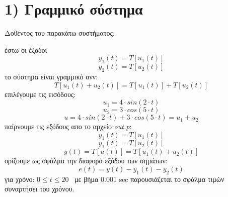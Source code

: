 \documentclass{article}
\begin{document}
\section*{1) Γραμμικό σύστημα}
\large
Δοθέντος του παρακάτω συστήματος:
\begin{center}

\end{center}
έστω οι έξοδοι 
\begin{equation*}
y_1(t) = T\left[u_1(t)\right]
\end{equation*}
\begin{equation*}
y_2(t) = T\left[u_2(t)\right]
\end{equation*}
το σύστημα είναι γραμμικό ανν: 
\begin{equation*}
T\left[u_1(t) + u_2(t)\right] = T\left[u_1(t)\right] + T\left[u_2(t)\right]
\end{equation*}
επιλέγουμε τις εισόδους: 
\begin{equation*}
\boxed{
u_1 = 4 \cdot sin(2 \cdot t)
}
\end{equation*}
\begin{equation*}
\boxed{
u_2 = 3 \cdot cos(5 \cdot t)
}
\end{equation*}
\begin{equation*}
\boxed{
u = 4 \cdot sin(2 \cdot t) + 3 \cdot cos(5 \cdot t) = u_1 + u_2
}
\end{equation*}
παίρνουμε τις εξόδους απο το αρχείο \textit{out.p}:
\begin{equation*}
\boxed{
y_1(t) = T\left[u_1(t)\right]
}
\end{equation*}
\begin{equation*}
\boxed{
y_1(t) = T\left[u_2(t)\right]
}
\end{equation*}
\begin{equation*}
\boxed{
y(t) = T\left[u(t)\right] = T\left[u_1(t) + u_2(t)\right]
}
\end{equation*}
ορίζουμε ως σφάλμα την διαφορά εξόδου των σημάτων:
\begin{equation*}
e(t) = y(t) - y_1(t) -y_2(t)
\end{equation*}
για χρόνο:  $ 0 \leq t \leq 20 \enspace$   με βήμα 0.001 sec παρουσιάζεται το σφάλμα τιμών συναρτήσει του χρόνου.
\newpage
\end{document}
